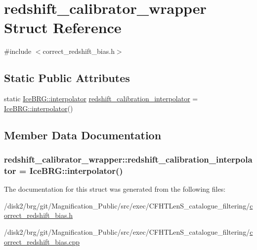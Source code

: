 \hypertarget{structredshift__calibrator__wrapper}{}\section{redshift\+\_\+calibrator\+\_\+wrapper Struct Reference}
\label{structredshift__calibrator__wrapper}


{\ttfamily \#include $<$correct\+\_\+redshift\+\_\+bias.\+h$>$}

\subsection*{Static Public Attributes}
\begin{DoxyCompactItemize}
\item 
static \hyperlink{classIceBRG_1_1interpolator}{Ice\+B\+R\+G\+::interpolator} \hyperlink{structredshift__calibrator__wrapper_a29c37afa3cd5a7aa03e1d4b3239d75db}{redshift\+\_\+calibration\+\_\+interpolator} = \hyperlink{classIceBRG_1_1interpolator}{Ice\+B\+R\+G\+::interpolator}()
\end{DoxyCompactItemize}


\subsection{Member Data Documentation}
\hypertarget{structredshift__calibrator__wrapper_a29c37afa3cd5a7aa03e1d4b3239d75db}{}
\subsubsection[{redshift\+\_\+calibration\+\_\+interpolator}]{ redshift\+\_\+calibrator\+\_\+wrapper\+::redshift\+\_\+calibration\+\_\+interpolator = {\bf Ice\+B\+R\+G\+::interpolator}()\hspace{0.3cm}{\ttfamily [static]}}\label{structredshift__calibrator__wrapper_a29c37afa3cd5a7aa03e1d4b3239d75db}


The documentation for this struct was generated from the following files\+:\begin{DoxyCompactItemize}
\item 
/disk2/brg/git/\+Magnification\+\_\+\+Public/src/exec/\+C\+F\+H\+T\+Len\+S\+\_\+catalogue\+\_\+filtering/\hyperlink{correct__redshift__bias_8h}{correct\+\_\+redshift\+\_\+bias.\+h}\item 
/disk2/brg/git/\+Magnification\+\_\+\+Public/src/exec/\+C\+F\+H\+T\+Len\+S\+\_\+catalogue\+\_\+filtering/\hyperlink{correct__redshift__bias_8cpp}{correct\+\_\+redshift\+\_\+bias.\+cpp}\end{DoxyCompactItemize}
